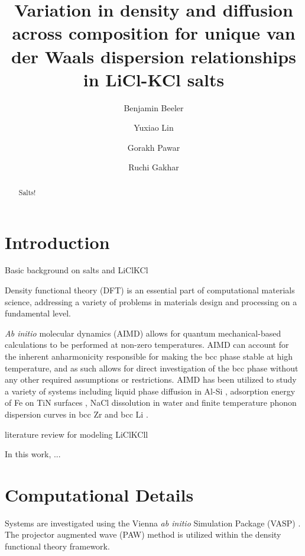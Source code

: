 \documentclass[review]{elsarticle}
\begin{document}
\begin{frontmatter}
\title{Variation in density and diffusion across composition for unique van der Waals dispersion relationships in LiCl-KCl salts}

\author[ncsu,inl]{Benjamin Beeler}
\author[in]{Yuxiao Lin}
\author[inl]{Gorakh Pawar}
\author[inl]{Ruchi Gakhar}
\address[ncsu]{North Carolina State University, Raleigh, NC 27607}
\address[inl]{Idaho National Laboratory, Idaho Falls, ID 83415}


\begin{abstract}

Salts!

\end{abstract}
\end{frontmatter}

\section{Introduction}

Basic background on salts and LiClKCl

Density functional theory (DFT) is an essential part of computational materials science, addressing a variety of problems in materials design and processing on a fundamental level. 


\textit{Ab initio} molecular dynamics (AIMD) allows for quantum mechanical-based calculations to be performed at non-zero temperatures. AIMD can account for the inherent anharmonicity responsible for making the bcc phase stable at high temperature, and as such allows for direct investigation of the bcc phase without any other required assumptions or restrictions.  AIMD has been utilized to study a variety of systems including liquid phase diffusion in Al-Si \cite{manga2018}, adsorption energy of Fe on TiN surfaces \cite{wang2010}, NaCl dissolution in water \cite{timko2010} and finite temperature phonon dispersion curves in bcc Zr and bcc Li \cite{hellman2011}. 

literature review for modeling LiClKCll

In this work, ...

\section{Computational Details}

Systems are investigated using the Vienna \textit{ab initio} Simulation Package (VASP) \cite{vasp1, vasp2, vasp3, vasp4}. The projector augmented wave (PAW) method \cite{paw1, paw2} is utilized within the density functional theory \cite{dft1, dft2} framework. 
\end{document}
